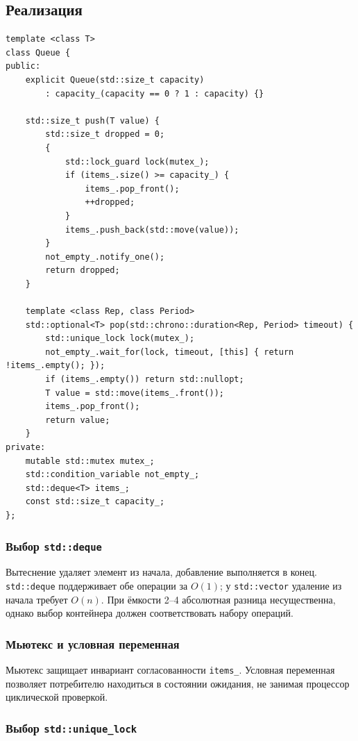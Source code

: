 \documentclass[11pt,a4paper]{article}
\theoremstyle{definition}
\theoremstyle{remark}
\begin{document}
\subsection{Реализация}

\begin{lstlisting}
template <class T>
class Queue {
public:
    explicit Queue(std::size_t capacity)
        : capacity_(capacity == 0 ? 1 : capacity) {}

    std::size_t push(T value) {
        std::size_t dropped = 0;
        {
            std::lock_guard lock(mutex_);
            if (items_.size() >= capacity_) {
                items_.pop_front();
                ++dropped;
            }
            items_.push_back(std::move(value));
        }
        not_empty_.notify_one();
        return dropped;
    }

    template <class Rep, class Period>
    std::optional<T> pop(std::chrono::duration<Rep, Period> timeout) {
        std::unique_lock lock(mutex_);
        not_empty_.wait_for(lock, timeout, [this] { return !items_.empty(); });
        if (items_.empty()) return std::nullopt;
        T value = std::move(items_.front());
        items_.pop_front();
        return value;
    }
private:
    mutable std::mutex mutex_;
    std::condition_variable not_empty_;
    std::deque<T> items_;
    const std::size_t capacity_;
};
\end{lstlisting}

\subsubsection{Выбор \texttt{std::deque}}

Вытеснение удаляет элемент из начала, добавление выполняется в конец.
\texttt{std::deque} поддерживает обе операции за $O(1)$; у
\texttt{std::vector} удаление из начала требует $O(n)$. При ёмкости 2--4
абсолютная разница несущественна, однако выбор контейнера должен
соответствовать набору операций.

\subsubsection{Мьютекс и условная переменная}

Мьютекс защищает инвариант согласованности \texttt{items\_}. Условная
переменная позволяет потребителю находиться в состоянии ожидания, не занимая
процессор циклической проверкой.

\subsubsection{Выбор \texttt{std::unique\_lock}}
\end{document}

